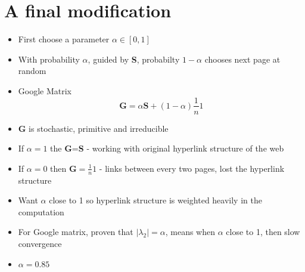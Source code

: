\documentclass[11pt]{report}
\begin{document}
\section{A final modification}
\begin{itemize}
\item First choose a parameter $\alpha\in[0,1]$ 
\item With probability $\alpha$, guided by \textbf{S}, probabilty $1-\alpha$ chooses next page at random
\item Google Matrix \begin{equation}
\textbf{G}=\alpha\textbf{S} +(1-\alpha)\frac{1}{n}1
\end{equation}
\item \textbf{G} is stochastic, primitive and irreducible
\item If $\alpha=1$ the \textbf{G}=\textbf{S} - working with original hyperlink structure of the web 
\item If $\alpha=0$ then $\textbf{G}=\frac{1}{n}1$ - links between every two pages, lost the hyperlink structure
\item Want $\alpha$ close to 1 so hyperlink structure is weighted heavily in the computation
\item For Google matrix, proven that $\vert\lambda_2\vert = \alpha$, means when $\alpha$ close to 1, then slow convergence
\item $\alpha= 0.85$
\end{itemize}
\end{document}
